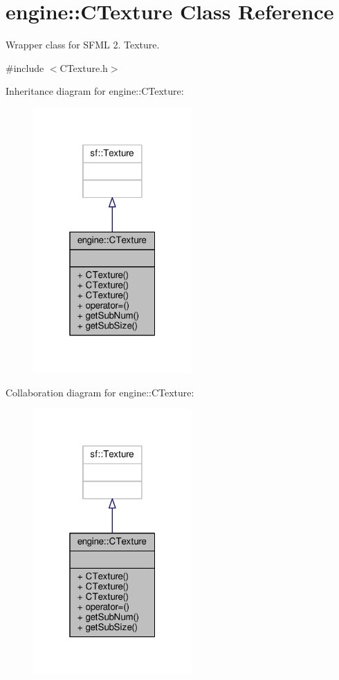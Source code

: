\hypertarget{classengine_1_1CTexture}{\section{engine\-:\-:C\-Texture Class Reference}
\label{classengine_1_1CTexture}
}


Wrapper class for S\-F\-M\-L 2. Texture.  




{\ttfamily \#include $<$C\-Texture.\-h$>$}



Inheritance diagram for engine\-:\-:C\-Texture\-:
\nopagebreak
\begin{figure}[H]
\begin{center}
\leavevmode
\includegraphics[width=172pt]{classengine_1_1CTexture__inherit__graph}
\end{center}
\end{figure}


Collaboration diagram for engine\-:\-:C\-Texture\-:
\nopagebreak
\begin{figure}[H]
\begin{center}
\leavevmode
\includegraphics[width=172pt]{classengine_1_1CTexture__coll__graph}
\end{center}
\end{figure}
